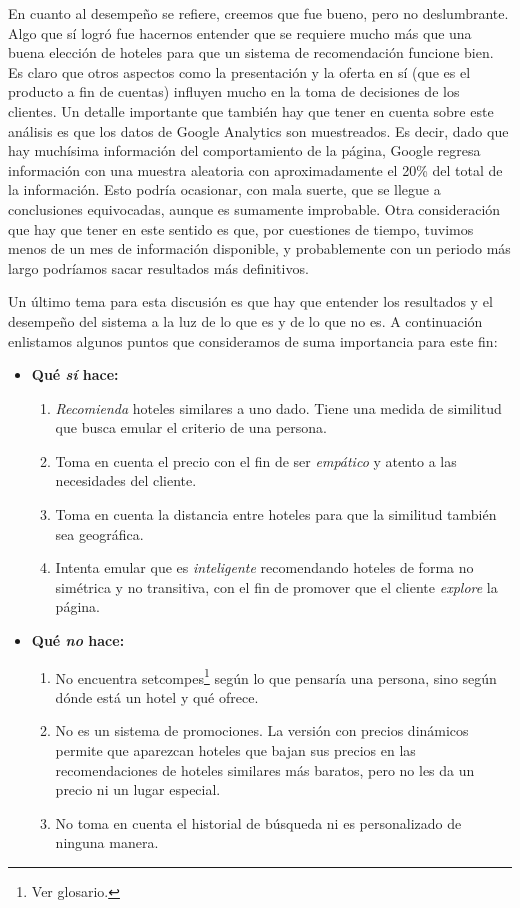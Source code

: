 \documentclass[12pt]{report}
\begin{document}
En cuanto al desempeño se refiere, creemos que fue bueno, pero no deslumbrante. Algo que sí logró fue hacernos entender que se requiere mucho más que una buena elección de hoteles para que un sistema de recomendación funcione bien. Es claro que otros aspectos como la presentación y la oferta en sí (que es el producto a fin de cuentas) influyen mucho en la toma de decisiones de los clientes. Un detalle importante que también hay que tener en cuenta sobre este análisis es que los datos de Google Analytics son muestreados. Es decir, dado que hay muchísima información del comportamiento de la página, Google regresa información con una muestra aleatoria con aproximadamente el 20\% del total de la información. Esto podría ocasionar, con mala suerte, que se llegue a conclusiones equivocadas, aunque es sumamente improbable. Otra consideración que hay que tener en este sentido es que, por cuestiones de tiempo, tuvimos menos de un mes de información disponible, y probablemente con un periodo más largo podríamos sacar resultados más definitivos.

Un último tema para esta discusión es que hay que entender los resultados y el desempeño del sistema a la luz de lo que es y de lo que no es. A continuación enlistamos algunos puntos que consideramos de suma importancia para este fin:
\begin{itemize}
	\item \textbf{Qué \emph{sí} hace:}
	\begin{enumerate}
		\item \emph{Recomienda} hoteles similares a uno dado. Tiene una medida de similitud que busca emular el criterio de una persona.
		\item Toma en cuenta el precio con el fin de ser \emph{empático} y atento a las necesidades del cliente.
		\item Toma en cuenta la distancia entre hoteles para que la similitud también sea geográfica.
		\item Intenta emular que es \emph{inteligente} recomendando hoteles de forma no simétrica y no transitiva, con el fin de promover que el cliente \emph{explore} la página.
	\end{enumerate}
	\item \textbf{Qué \emph{no} hace:}
	\begin{enumerate}
		\item No encuentra \glspl{setcompe}\footnote{Ver glosario.} según lo que pensaría una persona, sino según dónde está un hotel y qué ofrece.
		\item No es un sistema de promociones. La versión con precios dinámicos permite que aparezcan hoteles que bajan sus precios en las recomendaciones de hoteles similares más baratos, pero no les da un precio ni un lugar especial.
		\item No toma en cuenta el historial de búsqueda ni es personalizado de ninguna manera.
	\end{enumerate}
\end{itemize}
\end{document}
